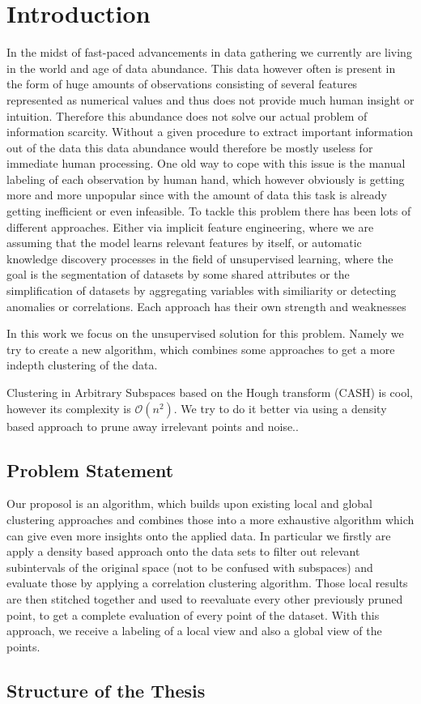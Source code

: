 \chapter{Introduction}

In the midst of fast-paced advancements in data gathering we currently are living in the world and age of data abundance. This data however often is present in the form of huge amounts of observations consisting of several features represented as numerical values and thus does not provide much human insight or intuition. Therefore this abundance does not solve our actual problem of information scarcity. Without a given procedure to extract important information out of the data this data abundance would therefore be mostly useless for immediate human processing. One old way to cope with this issue is the manual labeling of each observation by human hand, which however obviously is getting more and more unpopular since with the amount of data this task is already getting inefficient or even infeasible. %
To tackle this problem there has been lots of different approaches. Either via implicit feature engineering, where we are assuming that the model learns relevant features by itself, or automatic knowledge discovery processes in the field of unsupervised learning, where the goal is  the segmentation of datasets by some shared attributes or the simplification of datasets by aggregating variables with similiarity or detecting anomalies or correlations. Each approach has their own strength and weaknesses

In this work we focus on the unsupervised solution for this problem. Namely we try to create a new algorithm, which combines some approaches to get a more indepth clustering of the data.

Clustering in Arbitrary Subspaces based on the Hough transform (CASH) is cool, however its complexity is $\mathcal{O}(n^2)$.
We try to do it better via using a density based approach to prune away irrelevant points and noise..

\section{Problem Statement}
Our proposol is an algorithm, which builds upon existing local and global clustering approaches and combines those into a more exhaustive algorithm which can give even more insights onto the applied data. In particular we firstly are apply a density based approach onto the data sets to filter out relevant subintervals of the original space (not to be confused with subspaces) and evaluate those by applying a correlation clustering algorithm. Those local results are then stitched together and used to reevaluate every other previously pruned point, to get a complete evaluation of every point of the dataset. With this approach, we receive a labeling of a local view and also a global view of the points. 

\section{Structure of the Thesis}
